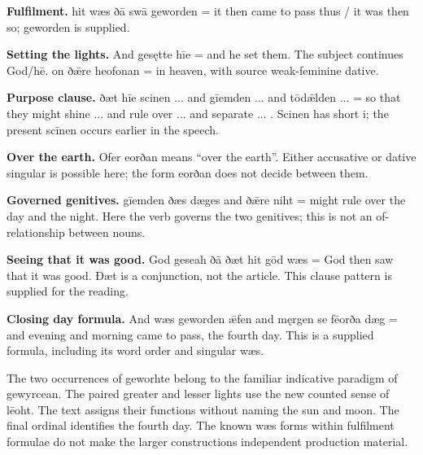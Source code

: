 \textbf{Fulfilment.} hit wæs ðā swā geworden = it then came to pass thus /\allowbreak{} it was then so; geworden is supplied.

\textbf{Setting the lights.} And gesętte hīe = and he set them. The subject continues God/\allowbreak{}hē. on ðǣre heofonan = in heaven, with source weak-feminine dative.

\textbf{Purpose clause.} ðæt hīe scinen ... and gīemden ... and tōdǣlden ... = so that they might shine ... and rule over ... and separate ... . Scinen has short i; the present scīnen occurs earlier in the speech.

\textbf{Over the earth.} Ofer eorðan means “over the earth”. Either accusative or dative singular is possible here; the form eorðan does not decide between them.

\textbf{Governed genitives.} gīemden ðæs dæges and ðǣre niht = might rule over the day and the night. Here the verb governs the two genitives; this is not an of-relationship between nouns.

\textbf{Seeing that it was good.} God geseah ðā ðæt hit gōd wæs = God then saw that it was good. Ðæt is a conjunction, not the article. This clause pattern is supplied for the reading.

\textbf{Closing day formula.} And wæs geworden ǣfen and męrgen se fēorða dæg = and evening and morning came to pass, the fourth day. This is a supplied formula, including its word order and singular wæs.

The two occurrences of geworhte belong to the familiar indicative paradigm of gewyrcean. The paired greater and lesser lights use the new counted sense of lēoht. The text assigns their functions without naming the sun and moon. The final ordinal identifies the fourth day. The known wæs forms within fulfilment formulae do not make the larger constructions independent production material.

